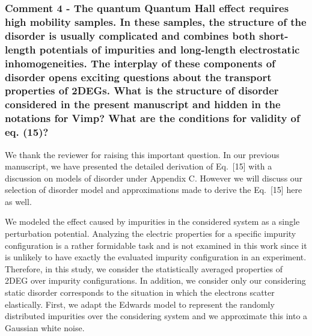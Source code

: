 \documentclass{article}
\begin{document}
\subsubsection*{Comment 4 -
\color{RoyalBlue} The quantum Quantum Hall effect requires high mobility samples. In these samples, the structure of the disorder is usually complicated and combines both short-length potentials of impurities and long-length electrostatic inhomogeneities. The interplay of these components of disorder opens exciting questions about the transport properties of 2DEGs. What is the structure of disorder considered in the present manuscript and hidden in the notations for Vimp? What are the conditions for validity of eq. (15)?
}

We thank the reviewer for raising this important question. In our previous manuscript, we have presented the detailed derivation of Eq.~[15] with a discussion on models of disorder under Appendix C. However we will discuss our selection of disorder model and approximations made to derive the Eq.~[15] here as well.

We modeled the effect caused by impurities in the considered system as a single perturbation potential. Analyzing the electric properties for a specific impurity configuration is a rather formidable task and is not examined in this work since it is unlikely to have exactly the evaluated impurity configuration in an experiment. Therefore, in this study, we consider the statistically averaged properties of 2DEG over impurity configurations. In addition, we consider only our considering static disorder corresponds to the situation in which the electrons scatter elastically. First, we adapt the Edwards model \cite{akkermans10} to represent the randomly distributed impurities over the considering system and we approximate this into a Gaussian white noise.
\end{document}
